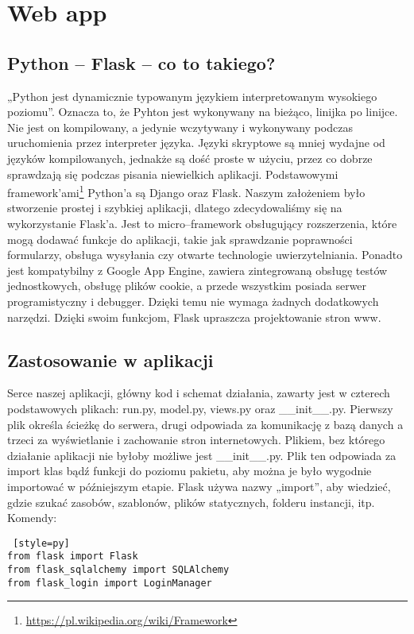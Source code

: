 \documentclass{xmgr}
\begin{document}
\chapter{Web app}

\section{Python -- Flask -- co to takiego?}
„Python jest dynamicznie typowanym językiem interpretowanym wysokiego poziomu”\cite{Bednarz:2017:Python}. Oznacza to, że Pyhton jest wykonywany na bieżąco, linijka po linijce. Nie jest on kompilowany, a jedynie wczytywany i wykonywany podczas uruchomienia przez interpreter języka. Języki skryptowe są mniej wydajne od języków kompilowanych, jednakże są dość proste w użyciu, przez co dobrze sprawdzają się podczas pisania niewielkich aplikacji. 
Podstawowymi framework’ami\footnote{\url{https://pl.wikipedia.org/wiki/Framework}} Python’a są Django oraz Flask\cite{Ronacher:2017:Flask}. Naszym założeniem było stworzenie prostej i szybkiej aplikacji, dlatego zdecydowaliśmy się na wykorzystanie Flask’a. Jest to micro--framework obsługujący rozszerzenia, które mogą dodawać funkcje do aplikacji, takie jak sprawdzanie poprawności formularzy, obsługa wysyłania czy otwarte technologie uwierzytelniania. Ponadto jest kompatybilny z Google App Engine, zawiera zintegrowaną obsługę testów jednostkowych, obsługę plików cookie, a przede wszystkim posiada serwer programistyczny i debugger. Dzięki temu nie wymaga żadnych dodatkowych narzędzi. Dzięki swoim funkcjom, Flask upraszcza projektowanie stron www. 

\section{Zastosowanie w aplikacji}
Serce naszej aplikacji, główny kod i schemat działania, zawarty jest w czterech podstawowych plikach: run.py, model.py, views.py oraz \newline\_\_init\_\_.py.  Pierwszy plik określa ścieżkę do serwera, drugi odpowiada za komunikację z bazą danych a trzeci za wyświetlanie i zachowanie stron internetowych. Plikiem, bez którego działanie aplikacji nie byłoby możliwe jest \_\_init\_\_.py. Plik ten odpowiada za import klas bądź funkcji do poziomu pakietu, aby można je było wygodnie importować w późniejszym etapie. Flask używa nazwy „import”, aby wiedzieć, gdzie szukać zasobów, szablonów, plików statycznych, folderu instancji, itp.
Komendy:
\begin{lstlisting} [style=py] 
from flask import Flask
from flask_sqlalchemy import SQLAlchemy
from flask_login import LoginManager
\end{lstlisting}
\end{document}

